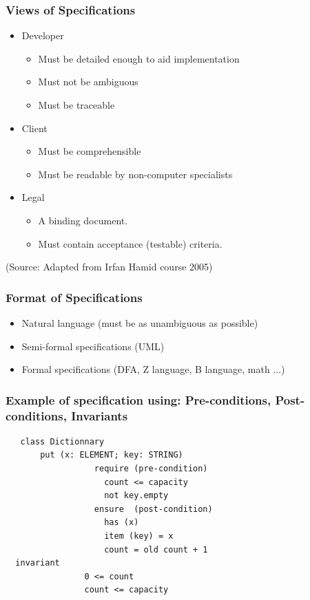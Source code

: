 \documentclass[10pt, handout]{beamer}
\begin{document}
\begin{frame}[fragile]
  \frametitle{Views of Specifications}
  \begin{itemize}
  \item Developer
    \begin{itemize}
    \item Must be detailed enough to aid implementation
    \item Must not be ambiguous
    \item Must be traceable
    \end{itemize}
  \item Client
    \begin{itemize}
    \item Must be comprehensible
    \item Must be readable by non-computer specialists
    \end{itemize}
  \item  Legal
    \begin{itemize}
    \item A binding document.
    \item Must contain acceptance (testable) criteria.
    \end{itemize}
  \end{itemize}
  \tiny (Source: Adapted from Irfan Hamid course 2005)
\end{frame}

\begin{frame}[fragile]
  \frametitle{Format of Specifications}
  \begin{itemize}
  \item Natural language (must be as unambiguous as possible)
  \item Semi-formal specifications (UML)
  \item Formal specifications (DFA, Z language, B language, math ...)
  \end{itemize}
\end{frame}

\begin{frame}[fragile]
  \frametitle{Example of specification using: Pre-conditions, Post-conditions, Invariants}
  \begin{verbatim}
   class Dictionnary
       put (x: ELEMENT; key: STRING)
                  require (pre-condition)
                    count <= capacity
                    not key.empty
                  ensure  (post-condition)
                    has (x)
                    item (key) = x
                    count = old count + 1
  invariant
                0 <= count
                count <= capacity
  \end{verbatim}
\end{frame}
\end{document}
